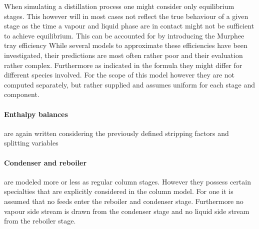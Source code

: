         When simulating a distillation process one might consider only equilibrium stages. This however
        will in most cases not reflect the true behaviour of a given stage as the time a vapour and
        liquid phase are in contact might not be sufficient to achieve equilibrium. This can be accounted
        for by introducing the Murphee tray efficiency \cite{Henley.op.2011}
        While several models to approximate these efficiencies have been investigated, their predictions are
        most often rather poor \cite{Coulson.1999} and their evaluation rather complex. Furthermore as indicated
        in the formula they might differ for different species involved. For the scope of this model however
        they are not computed separately, but rather supplied and assumes uniform for each stage and component.

        \paragraph{Enthalpy balances} are again written considering the previously defined stripping factors
        and splitting variables
        \paragraph{Condenser and reboiler} are modeled more or less as regular column stages. However they possess
        certain specialties that are explicitly considered in the column model. For one it is assumed
        that no feeds enter the reboiler and condenser stage. Furthermore no vapour side stream is
        drawn from the condenser stage and no liquid side stream from the reboiler stage.

